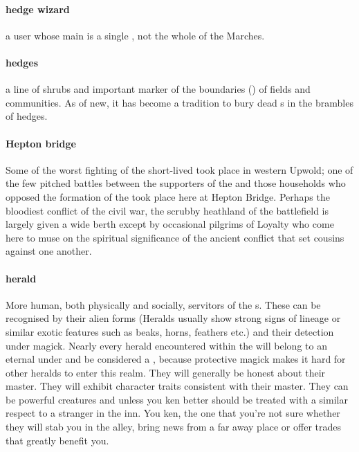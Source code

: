 \paragraph{hedge wizard} a  user whose main  is a single , not the whole of the Marches.
\paragraph{hedges} a line of shrubs and important marker of the boundaries () of fields and communities. As of new, it has become a tradition to bury dead s in the brambles of hedges. 
\paragraph{Hepton bridge} Some of the worst fighting of the short-lived  took place in western Upwold; one of the few pitched battles between the supporters of the  and those households who opposed the formation of the  took place here at Hepton Bridge. Perhaps the bloodiest conflict of the civil war, the scrubby heathland of the battlefield is largely given a wide berth except by occasional pilgrims of Loyalty who come here to muse on the spiritual significance of the ancient conflict that set cousins against one another. 
\paragraph{herald} More human, both physically and socially, servitors of the s. These can be recognised by their alien forms (Heralds usually show strong signs of lineage or similar exotic features such as beaks, horns, feathers etc.) and their detection under magick.  Nearly every herald encountered within the  will belong to an eternal under  and be considered a , because protective magick makes it hard for other heralds to enter this realm. They will generally be honest about their master. They will exhibit character traits consistent with their master. They can be powerful creatures and unless you ken better should be treated with a similar respect to a stranger in the inn. You ken, the one that you're not sure whether they will stab you in the alley, bring news from a far away place or offer trades that greatly benefit you.

